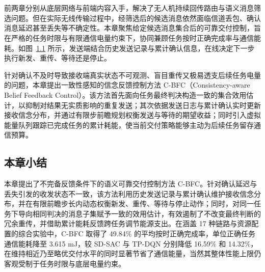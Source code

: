 \chapter{\ResearchThreeTitle}
\label{rq3:chapter}

前两章分别从底层网络与前端内容入手，解决了无人机持续回传路由与语义消息筛选问题。但在实际无线传输过程中，经筛选后的候选消息依然面临信道丢包、确认消息延迟甚至丢失等不确定性。本章聚焦给定候选消息集合后的可靠交付控制，旨在严格的任务时限与有限通信电量约束下，协同兼顾任务按时正确完成率与通信能耗。如图~\ref{rq3:fig:system} 所示，发送端结合历史发送记录与累计确认信息，在线决定下一步执行新发、重传、等待还是停止。

\begin{figure}[htbp]
\centering

\label{rq3:fig:system}
\end{figure}

针对确认不及时导致接收端真实状态不可观测、盲目重传又极易透支后续任务电量的问题，本章提出一致性感知的信念反馈控制方法 C-BFC（Consistency-aware Belief Feedback Control）。该方法首先面向任务最终判决构造一致的集合效用估计，以抑制对结果无实质影响的重复发送；其次依据发送日志与累计确认实时更新接收信念分布，并通过有限步前瞻规划权衡发送与等待的期望收益；同时引入虚拟能量队列跟踪已完成任务的累计耗能，使当前交付策略能够主动为后续任务留存通信预算。





\section{本章小结}
\label{rq3:subsec:discussion}

本章提出了不完备反馈条件下的语义可靠交付控制方法 C-BFC。针对确认延迟与丢失引发的收发状态不一致，该方法利用历史发送记录与累计确认维护接收信念分布，并在有限前瞻步长内动态权衡新发、重传、等待与停止动作；同时，对同一任务下导向相同判决的消息子集赋予一致的效用估计，有效遏制了不改变最终判断的冗余重传，并借助累计能耗反馈跨任务调节能源支出。在涵盖 17 种链路与资源配置的综合实验中，C-BFC 取得了 49.84\% 的平均按时正确完成率，单位正确任务通信能耗降至 3.615 mJ，较 SD-SAC 与 TP-DQN 分别降低 16.59\% 和 14.32\%，在维持相近乃至略优交付水平的同时显著节省了通信能量，当然其整体性能上限仍客观受制于任务时限与底层电量约束。
